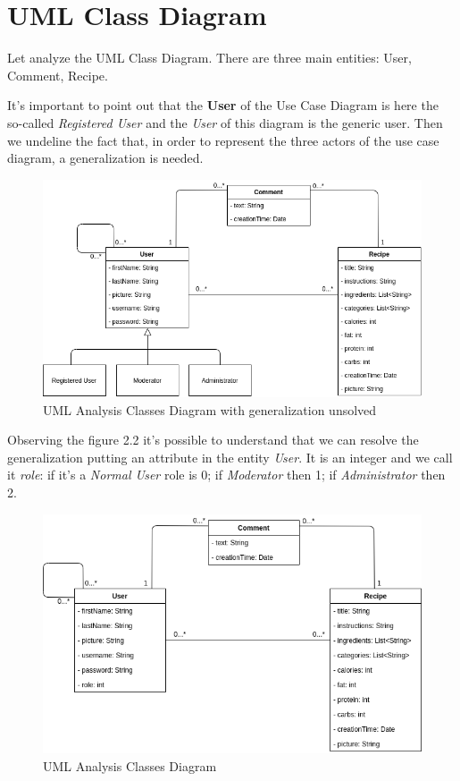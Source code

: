 \documentclass[a4paper]{report}
\begin{document}
\section{UML Class Diagram}
Let analyze the UML Class Diagram. There are three main entities: User, Comment, Recipe.

\noindent It's important to point out that the \textbf{User} of the Use Case Diagram is here the so-called \emph{Registered User} and the \emph{User} of this diagram is the generic user. Then we undeline the fact that, in order to represent the three actors of the use case diagram, a generalization is needed.
 
\begin{figure}[htpb]
	\centering
	\includegraphics[scale=0.5]{img/ClassDiagram_generaliz.png}
	\caption{UML Analysis Classes Diagram with generalization unsolved}
\end{figure}

\noindent Observing the figure 2.2 it's possible to understand that we can resolve the generalization putting an attribute in the entity \emph{User}. It is an integer and we call it \emph{role}: if it's a \emph{Normal User} role is 0; if \emph{Moderator} then 1; if \emph{Administrator} then 2.

\begin{figure}[htpb]
	\centering
	\includegraphics[scale=0.5]{img/ClassDiagram.png}
	\caption{UML Analysis Classes Diagram}
\end{figure}
\end{document}
